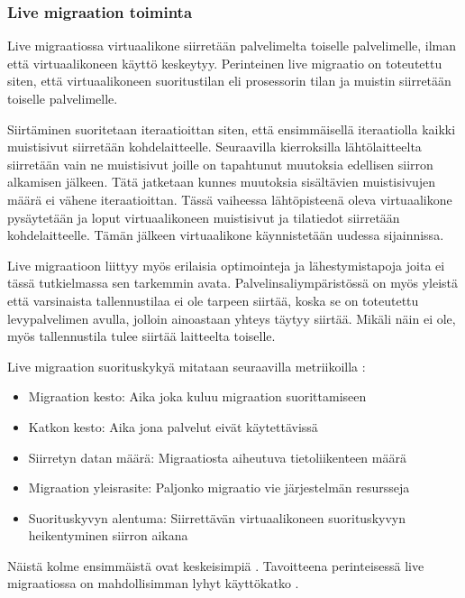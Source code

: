 \subsubsection*{Live migraation toiminta}%
Live migraatiossa virtuaalikone siirretään palvelimelta toiselle palvelimelle, ilman että virtuaalikoneen käyttö keskeytyy. 
Perinteinen live migraatio on toteutettu siten, että virtuaalikoneen suoritustilan eli prosessorin tilan ja muistin siirretään toiselle palvelimelle.

Siirtäminen suoritetaan iteraatioittan siten, että ensimmäisellä iteraatiolla kaikki muistisivut siirretään kohdelaitteelle.
Seuraavilla kierroksilla lähtölaitteelta siirretään vain ne muistisivut joille on tapahtunut muutoksia edellisen siirron alkamisen jälkeen. 
Tätä jatketaan kunnes muutoksia sisältävien muistisivujen määrä ei vähene iteraatioittan.
Tässä vaiheessa lähtöpisteenä oleva virtuaalikone pysäytetään ja loput virtuaalikoneen muistisivut ja tilatiedot siirretään kohdelaitteelle. Tämän jälkeen virtuaalikone käynnistetään uudessa sijainnissa. 

Live migraatioon liittyy myös erilaisia optimointeja ja lähestymistapoja joita ei tässä tutkielmassa sen tarkemmin avata. 
Palvelinsaliympäristössä on myös yleistä että varsinaista tallennustilaa ei ole tarpeen siirtää, koska se on toteutettu levypalvelimen avulla, jolloin ainoastaan yhteys täytyy siirtää. Mikäli näin ei ole, myös tallennustila tulee siirtää laitteelta toiselle.

Live migraation suorituskykyä mitataan seuraavilla metriikoilla \cite{soni2013comparative}:

\begin{itemize}
	\item Migraation kesto: Aika joka kuluu migraation suorittamiseen
	\item Katkon kesto: Aika jona palvelut eivät käytettävissä
	\item Siirretyn datan määrä: Migraatiosta aiheutuva tietoliikenteen määrä
	\item Migraation yleisrasite: Paljonko migraatio vie järjestelmän resursseja
	\item Suorituskyvyn alentuma: Siirrettävän virtuaalikoneen suorituskyvyn heikentyminen siirron aikana
\end{itemize}

Näistä kolme ensimmäistä ovat keskeisimpiä \cite{farris2017lightweight}. Tavoitteena perinteisessä live migraatiossa on mahdollisimman lyhyt käyttökatko \cite{ha2015adaptive}.

